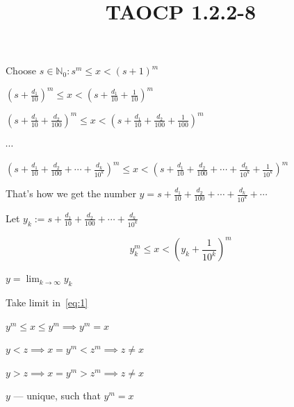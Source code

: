 \documentclass{article}
\title{TAOCP 1.2.2\mbox{-}8}
\begin{document}
\maketitle

Choose \( s \in \mathbb{N}_{0}: s^{m} \leq x < {(s+1)}^{m} \)

\( {(s + \frac{d_{1}}{10})}^{m} \leq x < {(s + \frac{d_{1}}{10} + \frac{1}{10})}^{m} \)

\( {(s + \frac{d_{1}}{10} + \frac{d_{2}}{100})}^{m} \leq x < {(s + \frac{d_{1}}{10} + \frac{d_{2}}{100} + \frac{1}{100})}^{m} \)

\( \cdots \)

\( {(s + \frac{d_{1}}{10} + \frac{d_{2}}{100} + \cdots + \frac{d_{k}}{10^{k}})}^{m} \leq x < {(s + \frac{d_{1}}{10} + \frac{d_{2}}{100} + \cdots + \frac{d_{k}}{10^{k}} + \frac {1}{10^{k}})}^{m} \)

That's how we get the number \( y = s + \frac{d_{1}}{10} + \frac{d_{2}}{100} + \cdots + \frac{d_{k}}{10^{k}} + \cdots \)

Let \( y_{k} := s + \frac{d_{1}}{10} + \frac{d_{2}}{100} + \cdots + \frac{d_{k}}{10^{k}} \)

\[y_{k}^{m} \leq x < {(y_{k} + \frac{1}{10^{k}})}^{m} \tag{1}\label{eq:1}\]

\( y = \lim_{k \to \infty} y_{k} \)

Take limit in~\eqref{eq:1}

\( y^{m} \leq x \leq y^{m} \implies y^{m} = x \)

\( y < z \implies x = y^{m} < z^{m} \implies z \neq x \)

\( y > z \implies x = y^{m} > z^{m} \implies z \neq x \)

\( y \) --- unique, such that \( y^{m} = x \)
\end{document}

